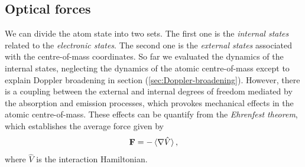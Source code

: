 {%
\subsection{Optical forces}
\label{sec:optical-forces}

We can divide the atom state into two sets. The first one is the \textit{internal states} related to the \textit{electronic states}. The second one is the \textit{external states} associated with the centre-of-mass coordinates. So far we evaluated the dynamics of the internal states, neglecting the dynamics of the atomic centre-of-mass except to explain Doppler broadening in section (\ref{sec:Doppler-broadening}). However, there is a coupling between the external and internal degrees of freedom mediated by the absorption and emission processes, which provokes mechanical effects in the atomic centre-of-mass. These effects can be quantify from the \textit{Ehrenfest theorem}, which establishes the average force given by
\begin{equation}
	\mathbf{F} = - \braket{\nabla \hat{V}},
	\label{eq:average-force}
\end{equation}
where $ \hat{V} $ is the interaction Hamiltonian. 

}
